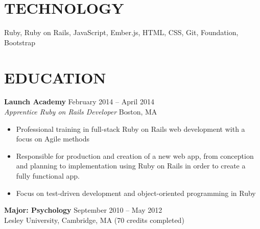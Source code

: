 \documentclass[margin]{res}
\begin{document}
\begin{resume}
\section{TECHNOLOGY} Ruby,  Ruby on Rails, JavaScript, Ember.js, HTML, CSS, Git, Foundation, Bootstrap \\ 
	       
\section{EDUCATION} 
			{\bf Launch Academy} \hfill February 2014 -- April 2014 \\
			{\sl Apprentice Ruby on Rails Developer} \hfill Boston, MA \
			\begin{itemize}  \itemsep -2pt %
			\item Professional training in full-stack Ruby on Rails web development with a focus 				on Agile methods
			\item  Responsible for production and creation of a new web app, from conception 				and planning to implementation using Ruby on Rails in order to create a fully 					functional app.
			\item Focus on test-driven development and object-oriented programming in Ruby
			\end{itemize}

			{\bf Major: Psychology} \hfill September 2010 -- May 2012\\
                Lesley University, Cambridge, MA 
                 (70 credits completed) \\ 

 
\end{resume}
\end{document}
